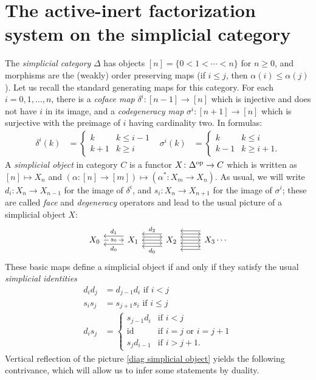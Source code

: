 \documentclass{amsart}
\theoremstyle{definition}
\theoremstyle{remark}
\newcommand{\op}{\textup{op}}
\DeclareMathOperator{\id}{id}
\begin{document}
\section{The active-inert factorization system on the simplicial category}\label{sec act inert fact}

The \emph{simplicial category} $\Delta$ has objects $[n] = \{0 < 1 < \cdots < n\}$ for $n\geq 0$, and morphisms are the (weakly) order preserving maps (if $i \leq j$, then $\alpha(i) \leq \alpha(j)$).
Let us recall the standard generating maps for this category.
For each $i = 0, 1, \dots, n$, there is a \emph{coface map} $\delta^i \colon [n-1] \to [n]$ which is injective and does not have $i$ in its image, and a \emph{codegeneracy map} $\sigma^i \colon [n+1] \to [n]$ which is surjective with the preimage of $i$ having cardinality two. %
In formulas:
\begin{align*}
  \delta^i(k) &= \begin{cases}
    k & k \leq i-1 \\
    k+1 & k \geq i
  \end{cases}
  &
  \sigma^i(k) &= \begin{cases}
    k & k \leq i \\
    k-1 & k \geq i+1.
  \end{cases}
\end{align*}
A \emph{simplicial object} in category $C$ is a functor $X \colon \Delta^\op \to C$ which is written as $[n] \mapsto X_n$ and $(\alpha \colon [n] \to [m]) \mapsto (\alpha^* \colon X_m \to X_n)$.
As usual, we will write $d_i \colon X_n \to X_{n-1}$ for the image of $\delta^i$, and $s_i \colon X_n \to X_{n+1}$ for the image of $\sigma^i$; these are called \emph{face} and \emph{degeneracy} operators and lead to the usual picture of a simplicial object $X$:
\begin{equation}\label{diag simplicial object} \begin{tikzcd}
X_0 \rar["s_0" description] & X_1 \lar[shift left=2, "d_0"] \lar[shift right=2, "d_1"']  \rar[shift left=1.5] \rar[shift right=1.5] & X_2 \lar[shift left=3,"d_0"] \lar[shift right=3,"d_2"'] \lar
\rar[shift left=3] \rar[shift right=3] \rar &
X_3 
\lar[shift left=1.5] \lar[shift left=4.5] \lar[shift right=1.5] \lar[shift right=4.5] \cdots
\end{tikzcd} \end{equation}
These basic maps define a simplicial object if and only if they satisfy the usual \emph{simplicial identities}
\begin{align*}
d_i d_j &= d_{j-1} d_i \text{ if  $i < j$} \\
s_i s_j &= s_{j+1} s_i \text{ if $i\leq j$} \\
d_i s_j &= \begin{cases}
  s_{j-1} d_i & \text{if $i < j$} \\
  \id & \text{if $i=j$ or $i=j+1$} \\
  s_j d_{i-1} & \text{if $i > j+1$.}
\end{cases}
\end{align*}
Vertical reflection of the picture \eqref{diag simplicial object} yields the following contrivance, which will allow us to infer some statements by duality.
\end{document}
